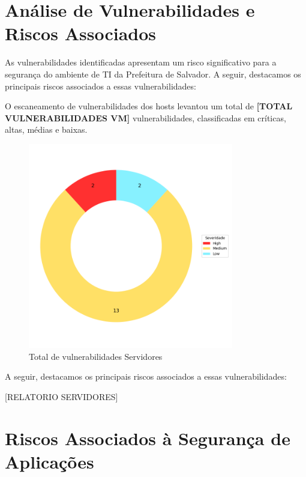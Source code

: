 \documentclass[a4paper,12pt]{article}
\begin{document}
\section{Análise de Vulnerabilidades e Riscos Associados}
As vulnerabilidades identificadas apresentam um risco significativo para a segurança do ambiente de TI da Prefeitura de Salvador.
A seguir, destacamos os principais riscos associados a essas vulnerabilidades:

O escaneamento de vulnerabilidades dos hosts levantou um total de \textbf{[TOTAL VULNERABILIDADES VM]} vulnerabilidades, classificadas em críticas, altas, médias e baixas.
    \begin{figure}[h!]
    \centering
    \includegraphics[width=0.8\textwidth]{images-vmscan/total-vulnerabilidades-vm-donut.png} %
    \caption{Total de vulnerabilidades Servidores}
\end{figure}
\FloatBarrier
A seguir, destacamos os principais riscos associados a essas vulnerabilidades: 

[RELATORIO SERVIDORES]

\section{Riscos Associados à Segurança de Aplicações}
\end{document}
